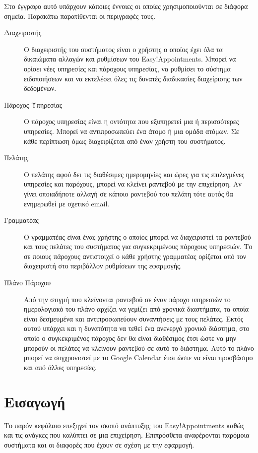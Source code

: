\begin{Definitions}
Στο έγγραφο αυτό υπάρχουν κάποιες έννοιες οι οποίες χρησιμοποιούνται 
σε διάφορα σημεία. Παρακάτω παρατίθενται οι περιγραφές τους.
\begin{description}
\item [Διαχειριστής] Ο διαχειριστής του συστήματος είναι ο χρήστης ο οποίος έχει όλα τα δικαιώματα αλλαγών και ρυθμίσεων του Easy!Appointments. Μπορεί να ορίσει νέες υπηρεσίες και πάροχους υπηρεσίας, να ρυθμίσει το σύστημα ειδοποιήσεων και να εκτελέσει όλες τις δυνατές διαδικασίες διαχείρισης των δεδομένων.

\item [Πάροχος Υπηρεσίας] Ο πάροχος υπηρεσίας είναι η οντότητα που εξυπηρετεί μια ή περισσότερες υπηρεσίες. Μπορεί να αντιπροσωπεύει ένα άτομο ή μια ομάδα ατόμων. Σε κάθε περίπτωση όμως διαχειρίζεται από έναν χρήστη του συστήματος.

\item [Πελάτης] Ο πελάτης αφού δει τις διαθέσιμες ημερομηνίες και ώρες για τις επιλεγμένες υπηρεσίες και παρόχους, μπορεί να κλείνει ραντεβού με την επιχείρηση. Αν γίνει οποιαδήποτε αλλαγή σε κάποιο ραντεβού του πελάτη τότε αυτός θα ενημερωθεί με σχετικό email.

\item [Γραμματέας] Ο γραμματέας είναι ένας χρήστης ο οποίος μπορεί να διαχειριστεί τα ραντεβού και τους πελάτες του συστήματος για συγκεκριμένους πάροχους υπηρεσιών. Το σε ποιους πάροχους αντιστοιχεί ο κάθε χρήστης γραμματέας ορίζεται από τον διαχειριστή στο περιβάλλον ρυθμίσεων της εφαρμογής.

\item [Πλάνο Πάροχου] Από την στιγμή που κλείνονται ραντεβού σε έναν πάροχο υπηρεσιών το ημερολογιακό του πλάνο αρχίζει να γεμίζει από χρονικά διαστήματα, τα οποία είναι δεσμευμένα και αντιπροσωπεύουν συναντήσεις με τους πελάτες. Εκτός αυτού υπάρχει και η δυνατότητα να τεθεί ένα ανενεργό χρονικό διάστημα, στο οποίο ο συγκεκριμένος πάροχος δεν θα είναι διαθέσιμος έτσι ώστε να μην μπορούν οι πελάτες να κλείνουν ραντεβού σε αυτό το διάστημα. Αυτό το πλάνο μπορεί να συγχρονιστεί με το Google Calendar έτσι ώστε να είναι προσβάσιμο και από άλλες υπηρεσίες. 
\end{description}
\end{Definitions}

\chapter{Εισαγωγή}
\leftmark\rightmark
Το παρόν κεφάλαιο επεξηγεί τον σκοπό ανάπτυξης του Easy!Appointments καθώς και τις ανάγκες που καλύπτει σε μια επιχείρηση. Επιπρόσθετα αναφέρονται παρόμοια συστήματα και οι διαφορές που έχουν σε σχέση με την εφαρμογή.

